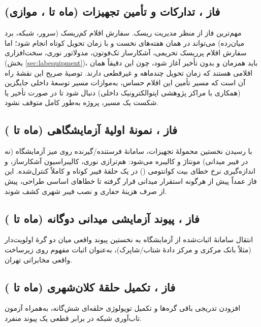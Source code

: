 \subsection*{فاز \texorpdfstring{}{۲}، تدارکات و تأمین تجهیزات (ماه \texorpdfstring{}{۲} تا \texorpdfstring{}{۸}، موازی)}
مهم‌ترین فاز از منظر مدیریت ریسک. سفارش اقلام کم‌ریسک (سرور، شبکه، برد  میان‌رده) می‌تواند در همان هفته‌های نخست و با زمان تحویل کوتاه انجام شود؛ اما سفارش اقلام پرریسک تحریمی، آشکارساز تک‌فوتون، مدولاتور نوری،  سخت‌افزاری (بخش \ref{sec:labequipment})، باید همزمان و بدون تأخیر آغاز شود، چون این دقیقاً همان اقلامی هستند که زمان تحویل چندماهه و غیرقطعی دارند. توصیهٔ صریح این نقشهٔ راه آن است که مسیر تأمین این اقلام حساس، به‌موازات مسیر توسعهٔ داخلی جایگزین (همکاری با مراکز پژوهشی اپتوالکترونیک داخلی) دنبال شود تا در صورت تأخیر یا شکست یک مسیر، پروژه به‌طور کامل متوقف نشود.

\subsection*{فاز \texorpdfstring{}{۳}، نمونهٔ اولیهٔ آزمایشگاهی \texorpdfstring{}{QKD} (ماه \texorpdfstring{}{۴} تا \texorpdfstring{}{۸})}
با رسیدن نخستین محمولهٔ تجهیزات، سامانهٔ فرستنده/گیرنده روی میز آزمایشگاه (نه در فیبر میدانی) مونتاژ و کالیبره می‌شود: هم‌ترازی نوری، کالیبراسیون آشکارساز، و اندازه‌گیری نرخ خطای بیت کوانتومی () در یک حلقهٔ فیبر کوتاه و کاملاً کنترل‌شده. این فاز عمداً پیش از هرگونه استقرار میدانی قرار گرفته تا خطاهای اساسی طراحی، پیش از صرف هزینهٔ حفاری و نصب فیبر شهری کشف شوند.

\subsection*{فاز \texorpdfstring{}{۴}، پیوند آزمایشی میدانی دوگانه (ماه \texorpdfstring{}{۷} تا \texorpdfstring{}{۱۰})}
انتقال سامانهٔ اثبات‌شده از آزمایشگاه به نخستین پیوند واقعی میان دو گرهٔ اولویت‌دار (مثلاً بانک مرکزی و مرکز دادهٔ شتاب/شاپرک)، به‌عنوان اثبات مفهوم روی زیرساخت واقعی مخابراتی تهران.

\subsection*{فاز \texorpdfstring{}{۵}، تکمیل حلقهٔ کلان‌شهری (ماه \texorpdfstring{}{۹} تا \texorpdfstring{}{۱۳})}
افزودن تدریجی باقی گره‌ها و تکمیل توپولوژی حلقه‌ای شش‌گانه، به‌همراه آزمون تاب‌آوری شبکه در برابر قطعی یک پیوند منفرد.

